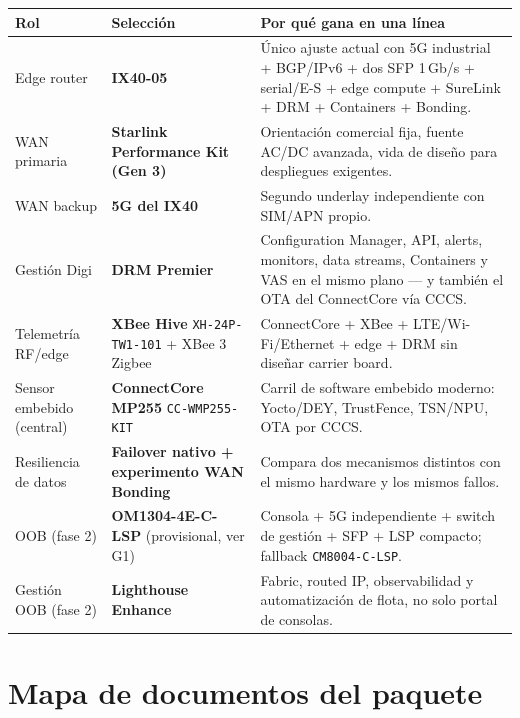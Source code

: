 \documentclass[11pt,a4paper]{article}
\newcommand{\hcell}[1]{\textbf{#1}}
\begin{document}
\begin{center}
\small
\begin{tabularx}{\textwidth}{@{}p{2.15cm} p{3.35cm} X@{}}
\toprule
\hcell{Rol} & \hcell{Selección} & \hcell{Por qué gana en una línea} \\
\midrule
Edge router & \textbf{IX40-05} & Único ajuste actual con 5G industrial + BGP/IPv6 + dos SFP 1\,Gb/s + serial/E-S + edge compute + SureLink + DRM + Containers + Bonding. \\
WAN primaria & \textbf{Starlink Performance Kit (Gen 3)} & Orientación comercial fija, fuente AC/DC avanzada, vida de diseño para despliegues exigentes. \\
WAN backup & \textbf{5G del IX40} & Segundo underlay independiente con SIM/APN propio. \\
Gestión Digi & \textbf{DRM Premier} & Configuration Manager, API, alerts, monitors, data streams, Containers y VAS en el mismo plano — y también el OTA del ConnectCore vía CCCS. \\
Telemetría RF/edge & \textbf{XBee Hive} \texttt{XH-24P-TW1-101} + XBee 3 Zigbee & ConnectCore + XBee + LTE/Wi-Fi/Ethernet + edge + DRM sin diseñar carrier board. \\
Sensor embebido (central) & \textbf{ConnectCore MP255} \texttt{CC-WMP255-KIT} & Carril de software embebido moderno: Yocto/DEY, TrustFence, TSN/NPU, OTA por CCCS. \\
Resiliencia de datos & \textbf{Failover nativo + experimento WAN Bonding} & Compara dos mecanismos distintos con el mismo hardware y los mismos fallos. \\
OOB (fase 2) & \textbf{OM1304-4E-C-LSP} (provisional, ver G1) & Consola + 5G independiente + switch de gestión + SFP + LSP compacto; fallback \texttt{CM8004-C-LSP}. \\
Gestión OOB (fase 2) & \textbf{Lighthouse Enhance} & Fabric, routed IP, observabilidad y automatización de flota, no solo portal de consolas. \\
\bottomrule
\end{tabularx}
\end{center}

\section{Mapa de documentos del paquete}
\end{document}
